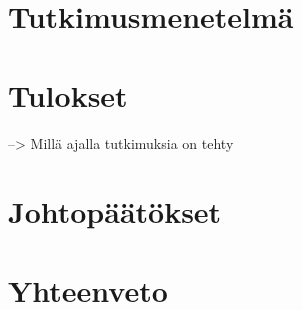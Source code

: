 \section{Tutkimusmenetelmä}
\label{sec:menetelma}

\citep{refworks:148}




\section{Tulokset}
\label{sec:tulokset}

--> Millä ajalla tutkimuksia on tehty




\section{Johtopäätökset}
\label{sec:johtopaatokset}





\section{Yhteenveto}
\label{sec:yhteenveto}





